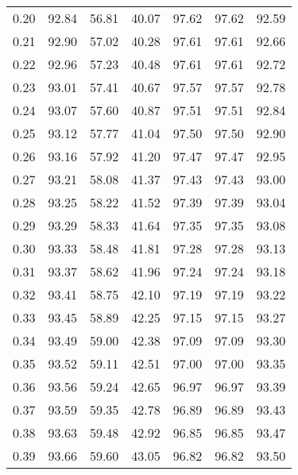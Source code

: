 \begin{tabular}{|c|c|c|c|c|c|c|}
      0.20 &     92.84 &     56.81 &      40.07 &   97.62 &      97.62 &         92.59 \\
      0.21 &     92.90 &     57.02 &      40.28 &   97.61 &      97.61 &         92.66 \\
      0.22 &     92.96 &     57.23 &      40.48 &   97.61 &      97.61 &         92.72 \\
      0.23 &     93.01 &     57.41 &      40.67 &   97.57 &      97.57 &         92.78 \\
      0.24 &     93.07 &     57.60 &      40.87 &   97.51 &      97.51 &         92.84 \\
      0.25 &     93.12 &     57.77 &      41.04 &   97.50 &      97.50 &         92.90 \\
      0.26 &     93.16 &     57.92 &      41.20 &   97.47 &      97.47 &         92.95 \\
      0.27 &     93.21 &     58.08 &      41.37 &   97.43 &      97.43 &         93.00 \\
      0.28 &     93.25 &     58.22 &      41.52 &   97.39 &      97.39 &         93.04 \\
      0.29 &     93.29 &     58.33 &      41.64 &   97.35 &      97.35 &         93.08 \\
      0.30 &     93.33 &     58.48 &      41.81 &   97.28 &      97.28 &         93.13 \\
      0.31 &     93.37 &     58.62 &      41.96 &   97.24 &      97.24 &         93.18 \\
      0.32 &     93.41 &     58.75 &      42.10 &   97.19 &      97.19 &         93.22 \\
      0.33 &     93.45 &     58.89 &      42.25 &   97.15 &      97.15 &         93.27 \\
      0.34 &     93.49 &     59.00 &      42.38 &   97.09 &      97.09 &         93.30 \\
      0.35 &     93.52 &     59.11 &      42.51 &   97.00 &      97.00 &         93.35 \\
      0.36 &     93.56 &     59.24 &      42.65 &   96.97 &      96.97 &         93.39 \\
      0.37 &     93.59 &     59.35 &      42.78 &   96.89 &      96.89 &         93.43 \\
      0.38 &     93.63 &     59.48 &      42.92 &   96.85 &      96.85 &         93.47 \\
      0.39 &     93.66 &     59.60 &      43.05 &   96.82 &      96.82 &         93.50 \\

\end{tabular}
